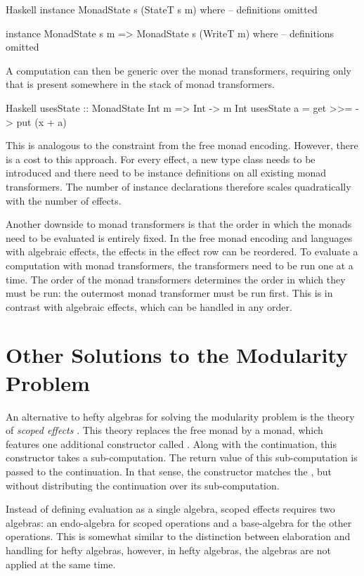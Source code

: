 \begin{lst}{Haskell}
instance MonadState s (StateT s m) where
  -- definitions omitted

instance MonadState s m => MonadState s (WriteT m) where
  -- definitions omitted
\end{lst}
%
A computation can then be generic over the monad transformers, requiring only that  is present somewhere in the stack of monad transformers.

\begin{lst}{Haskell}
usesState :: MonadState Int m => Int -> m Int
usesState a = get >>= \x -> put (x + a)
\end{lst}
%
This is analogous to the  constraint from the free monad encoding. However, there is a cost to this approach. For every effect, a new type class needs to be introduced and there need to be instance definitions on all existing monad transformers. The number of instance declarations therefore scales quadratically with the number of effects.

Another downside to monad transformers is that the order in which the monads need to be evaluated is entirely fixed. In the free monad encoding and languages with algebraic effects, the effects in the effect row can be reordered. To evaluate a computation with monad transformers, the transformers need to be run one at a time. The order of the monad transformers determines the order in which they must be run: the outermost monad transformer must be run first. This is in contrast with algebraic effects, which can be handled in any order.

\section{Other Solutions to the Modularity Problem}

An alternative to hefty algebras for solving the modularity problem is the theory of \emph{scoped effects} \autocite{wu_effect_2014,pirog_syntax_2018,yang_structured_2022}. This theory replaces the free monad by a  monad, which features one additional constructor called . Along with the continuation, this constructor takes a sub-computation. The return value of this sub-computation is passed to the continuation. In that sense, the  constructor matches the \hs{>>=}, but without distributing the continuation over its sub-computation.

Instead of defining evaluation as a single algebra, scoped effects requires two algebras: an endo-algebra for scoped operations and a base-algebra for the other operations. This is somewhat similar to the distinction between elaboration and handling for hefty algebras, however, in hefty algebras, the algebras are not applied at the same time.


